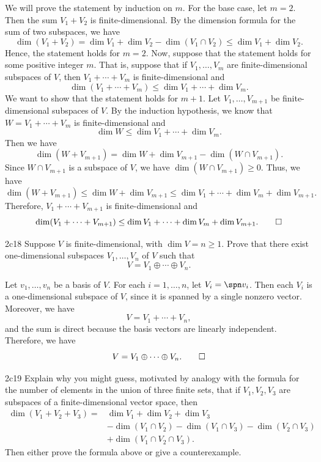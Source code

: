 \begin{sol}
    We will prove the statement by induction on $m$.
	For the base case, let $m = 2$.
	Then the sum $V_1 + V_2$ is finite-dimensional.
	By the dimension formula for the sum of two subspaces, we have
    \[
    	\dim(V_1 + V_2) = \dim V_1 + \dim V_2 - \dim(V_1 \cap V_2) \leq \dim V_1 + \dim V_2.
    \]
    Hence, the statement holds for $m = 2$.
	Now, suppose that the statement holds for some positive integer $m$.
	That is, suppose that if $V_1, \ldots, V_m$ are finite-dimensional subspaces of $V$, then $V_1 + \cdots + V_m$ is finite-dimensional and
    \[
    	\dim(V_1 + \cdots + V_m) \leq \dim V_1 + \cdots + \dim V_m.
    \]
    We want to show that the statement holds for $m + 1$.
	Let $V_1, \ldots, V_{m + 1}$ be finite-dimensional subspaces of $V$.
	By the induction hypothesis, we know that $W = V_1 + \cdots + V_m$ is finite-dimensional and
    \[
    	\dim W \leq \dim V_1 + \cdots + \dim V_m.
    \]
    Then we have
    \[
    	\dim(W + V_{m + 1}) = \dim W + \dim V_{m + 1} - \dim(W \cap V_{m + 1}).
    \]
    Since $W \cap V_{m + 1}$ is a subspace of $V$, we have $\dim(W \cap V_{m + 1}) \geq 0$.
	Thus, we have
    \[
    	\dim(W + V_{m + 1}) \leq \dim W + \dim V_{m + 1} \leq \dim V_1 + \cdots + \dim V_m + \dim V_{m + 1}.
    \]
    Therefore, $V_1 + \cdots + V_{m + 1}$ is finite-dimensional and
    \[
    	\dim(V_1 + \cdots + V_{m + 1}) \leq \dim V_1 + \cdots + \dim V_m + \dim V_{m + 1}. \qedhere
    \]
\end{sol}

\begin{exercise}{2c18}
    Suppose $V$ is finite-dimensional, with $\dim V = n \geq 1$.
	Prove that there exist one-dimensional subspaces $V_1, \ldots, V_n$ of $V$ such that
    \[
    	V = V_1 \oplus \cdots \oplus V_n.
    \]
\end{exercise}

\begin{sol}
    Let $v_1, \ldots, v_n$ be a basis of $V$.
	For each $i = 1, \ldots, n$, let $V_i = \spn v_i$.
	Then each $V_i$ is a one-dimensional subspace of $V$, since it is spanned by a single nonzero vector.
	Moreover, we have
    \[
    	V = V_1 + \cdots + V_n,
    \]
    and the sum is direct because the basis vectors are linearly independent.
	Therefore, we have
    \[
    	V = V_1 \oplus \cdots \oplus V_n. \qedhere
    \]
\end{sol}

\begin{exercise}{2c19}
    Explain why you might guess, motivated by analogy with the formula for the number of elements in the union of three finite sets, that if $V_1, V_2, V_3$ are subspaces of a finite-dimensional vector space, then
    \begin{align*}
        \dim(V_1 + V_2 + V_3) = & \dim V_1 + \dim V_2 + \dim V_3 \\
        & - \dim(V_1 \cap V_2) - \dim(V_1 \cap V_3) - \dim(V_2 \cap V_3) \\
        & + \dim(V_1 \cap V_2 \cap V_3).
    \end{align*}
    Then either prove the formula above or give a counterexample.
\end{exercise}

